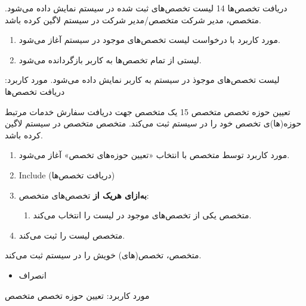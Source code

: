 
{
\usecase
{دریافت تخصص‌ها}
{14}
{لیست تخصص‌های ثبت شده در سیستم نمایش داده می‌شود.}
{متخصص، مدیر شرکت}
{}
{متخصص/مدیر شرکت در سیستم لاگین کرده باشد.}
{
	\vspace*{-0.6cm}
	\begin{enumerate}
		\item مورد کاربرد با درخواست لیست تخصص‌های موجود در سیستم آغاز می‌شود.
		\item لیستی از تمام تخصص‌ها به کاربر بازگردانده می‌شود.
	\end{enumerate}
}
{لیست تخصص‌های موجوذ در سیستم به کاربر نمایش داده می‌شود.}
{
}
{
	مورد کاربرد: دریافت تخصص‌ها
}
}


{
\usecase
{تعیین حوزه تخصص متخصص}
{15}
{یک متخصص جهت دریافت سفارش خدمات مرتبط حوزه‌(ها)ی تخصص خود را در سیستم ثبت می‌کند.}
{متخصص}
{}
{متخصص در سیستم لاگین کرده باشد.}
{
	\vspace*{-0.6cm}
	\begin{enumerate}
		\item مورد کاربرد توسط متخصص با انتخاب «تعیین حوزه‌های تخصص» آغاز می‌شود.
		\item Include (دریافت تخصص‌ها)
		\item 
		\textbf{به‌ازای هریک از}
		تخصص‌های متخصص:
		\begin{enumerate}[label=\theenumi.\arabic*.]
			\item متخصص یکی از تخصص‌های موجود در لیست را انتخاب می‌کند.
		\end{enumerate}
		\item 
		متخصص لیست را ثبت می‌کند.
	\end{enumerate}
}
{متخصص، تخصص(های) خویش را در سیستم ثبت می‌کند.}
{
	\begin{itemize}
		\vspace*{-0.6cm}
		\item انصراف
	\end{itemize}
}
{
	مورد کاربرد: تعیین حوزه تخصص متخصص
}

}

